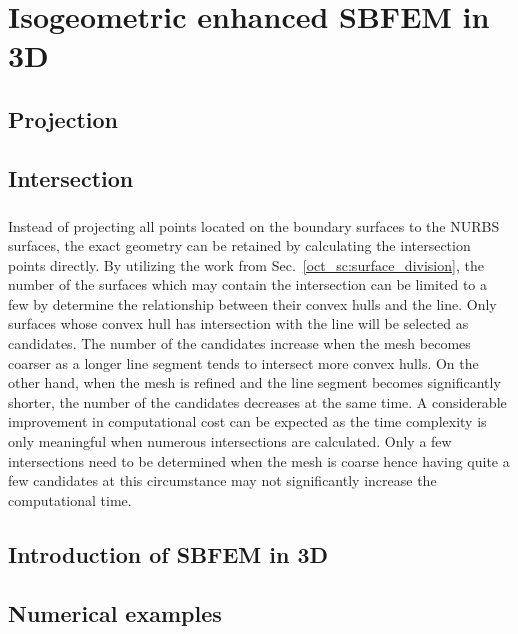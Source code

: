 
\chapter{Isogeometric enhanced SBFEM in 3D}


\section{Projection}




\section{Intersection}
\paragraph{}
Instead of projecting all points located on the boundary surfaces to the NURBS surfaces, the exact geometry can be retained by calculating the intersection points directly.
By utilizing the work from Sec.~\ref{oct_sc:surface_division}, the number of the surfaces which may contain the intersection can be limited to a few by determine the relationship between their convex hulls and the line.
Only surfaces whose convex hull has intersection with the line will be selected as candidates.
The number of the candidates increase when the mesh becomes coarser as a longer line segment tends to intersect more convex hulls.
On the other hand, when the mesh is refined and the line segment becomes significantly shorter, the number of the candidates decreases at the same time.
A considerable improvement in computational cost can be expected as the time complexity is only meaningful when numerous intersections are calculated.
Only a few intersections need to be determined when the mesh is coarse hence having quite a few candidates at this circumstance may not significantly increase the computational time.




\section{Introduction of SBFEM in 3D}


\section{Numerical examples}





